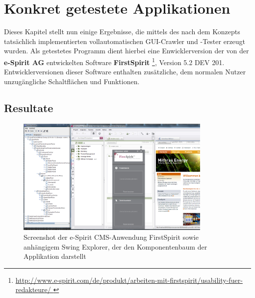 \chapter{Konkret getestete Applikationen}\label{chapter:concretetests}


Dieses Kapitel stellt nun einige Ergebnisse, die mittels des nach dem Konzepts tatsächlich
implementierten vollautomatischen GUI-Crawler und -Tester erzeugt wurden.
Als getestetes Programm dient hierbei eine Enwicklerversion der von der
\textbf{e-Spirit AG} entwickelten Software \textbf{FirstSpirit} 
\footnote{\url{ http://www.e-spirit.com/de/produkt/arbeiten-mit-firstspirit/usability-fuer-redakteure/ }},
Version 5.2 DEV 201. Entwicklerversionen dieser Software enthalten zusätzliche,
dem normalen Nutzer unzugängliche Schaltflächen und Funktionen.


\section{Resultate}\label{section:testresults}

\begin{figure}
	\centering
	\includegraphics[width=0.85\textwidth]{bilder/screenshot_freespirit.png}
	\caption{Screenshot der e-Spirit CMS-Anwendung FirstSpirit
	sowie anhängigem Swing Explorer, der den Komponentenbaum der Applikation darstellt}
	\label{fig:screenshot_freespirit}
\end{figure}

